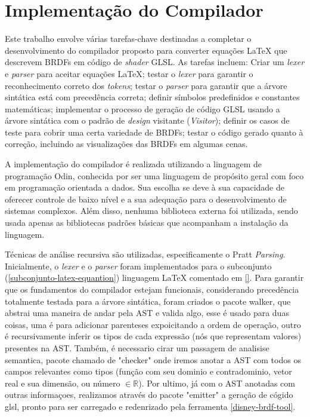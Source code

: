 \section{Implementação do Compilador} \label{compiladorimplementacao}
%
%


Este trabalho envolve várias tarefas-chave destinadas a completar o desenvolvimento do compilador proposto para converter equações \LaTeX{}  que descrevem BRDFs em código de \textit{shader} GLSL. As tarefas incluem: Criar um \textit{lexer} e \textit{parser} para aceitar equações \LaTeX{}; testar o \textit{lexer} para garantir o reconhecimento correto dos \textit{tokens}; testar o \textit{parser} para garantir que a árvore sintática está com precedência correta; definir símbolos predefinidos e constantes matemáticas; implementar o processo de geração de código GLSL usando a árvore sintática com o padrão de \textit{design} visitante (\textit{Visitor}); definir os casos de teste para cobrir uma certa variedade de BRDFs; testar o código gerado quanto à correção, incluindo as visualizações das BRDFs em algumas cenas.

A implementação do compilador é realizada utilizando a linguagem de programação Odin, conhecida por ser uma linguagem de propósito geral com foco em programação orientada a dados. Sua escolha se deve à sua capacidade de oferecer controle de baixo nível e a sua adequação para o desenvolvimento de sistemas complexos. Além disso, nenhuma biblioteca externa foi utilizada, sendo usada apenas as bibliotecas padrões básicas que acompanham a instalação da linguagem.

Técnicas de análise recursiva são utilizadas, especificamente o Pratt \textit{Parsing}. Inicialmente, o \textit{lexer} e o \textit{parser} foram implementados para o subconjunto (\autoref{subconjunto-latex-equantion}) linguagem \LaTeX{} comentado em \autoref{}. Para garantir que os fundamentos do compilador estejam funcionais, considerando precedência totalmente testada para a árvore sintática, foram criados o pacote walker, que abstrai uma maneira de andar pela AST e valida algo, esse é usado para duas coisas, uma é para adicionar parenteses expoicitando a ordem de operação, outro é recursivamente inferir os tipos de cada expressão (nós que representam valores) presentes na AST. Também, é necessario cirar um passagem de analisise semantica, pacote chamado de "checker" onde iremos anotar a AST com todos os campos relevantes como tipos (função com seu dominio e contradominio, vetor real e sua dimensão, ou número $\in \mathbb{R} $). Por ultimo, já com o AST anotadas com outras informaçoes, realizamos através do pacote "emitter" a geração de cógido glsl, pronto para ser carregado e redenrizado pela ferramenta \autoref{disney-brdf-tool}.

